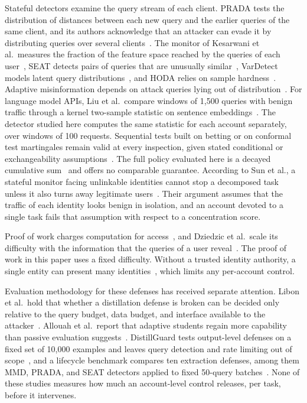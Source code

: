 \documentclass[conference]{IEEEtran}
\begin{document}
Stateful detectors examine the query stream of each client. PRADA tests the distribution of distances between each new query and the earlier queries of the same client, and its authors acknowledge that an attacker can evade it by distributing queries over several clients~\cite{juuti2019prada}. The monitor of Kesarwani et al.\ measures the fraction of the feature space reached by the queries of each user~\cite{kesarwani2018warning}, SEAT detects pairs of queries that are unusually similar~\cite{zhang2021seat}, VarDetect models latent query distributions~\cite{pal2021stateful}, and HODA relies on sample hardness~\cite{sadeghzadeh2022hoda}. Adaptive misinformation depends on attack queries lying out of distribution~\cite{kariyappa2020adaptive}. For language model APIs, Liu et al.\ compare windows of 1,500 queries with benign traffic through a kernel two-sample statistic on sentence embeddings~\cite{liu2026detector,mmd2026artifact}. The detector studied here computes the same statistic for each account separately, over windows of 100 requests. Sequential tests built on betting or on conformal test martingales remain valid at every inspection, given stated conditional or exchangeability assumptions~\cite{shekhar2023betting,vovk2021retrain,ramdas2023gametheoretic}. The full policy evaluated here is a decayed cumulative sum~\cite{page1954cusum} and offers no comparable guarantee. According to Sun et al., a stateful monitor facing unlinkable identities cannot stop a decomposed task unless it also turns away legitimate users~\cite{sun2026decomposition}. Their argument assumes that the traffic of each identity looks benign in isolation, and an account devoted to a single task fails that assumption with respect to a concentration score.

Proof of work charges computation for access~\cite{dwork1992pricing}, and Dziedzic et al.\ scale its difficulty with the information that the queries of a user reveal~\cite{dziedzic2022pow}. The proof of work in this paper uses a fixed difficulty. Without a trusted identity authority, a single entity can present many identities~\cite{douceur2002sybil}, which limits any per-account control.

Evaluation methodology for these defenses has received separate attention. Libon et al.\ hold that whether a distillation defense is broken can be decided only relative to the query budget, data budget, and interface available to the attacker~\cite{libon2026break}. Allouah et al.\ report that adaptive students regain more capability than passive evaluation suggests~\cite{allouah2026game}. DistillGuard tests output-level defenses on a fixed set of 10,000 examples and leaves query detection and rate limiting out of scope~\cite{jiang2026distillguard}, and a lifecycle benchmark compares ten extraction defenses, among them MMD, PRADA, and SEAT detectors applied to fixed 50-query batches~\cite{liu2026lifecycle}. None of these studies measures how much an account-level control releases, per task, before it intervenes.
\end{document}
